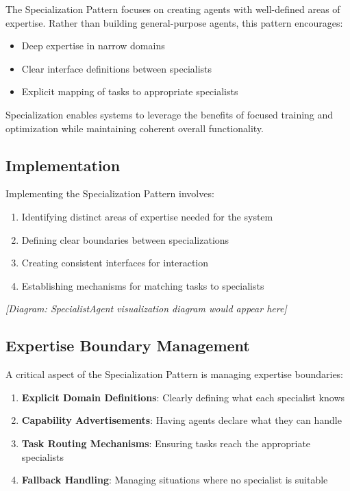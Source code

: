 \documentclass[11pt,oneside]{book}
\providecommand{\tightlist}{%
  \setlength{\itemsep}{0pt}\setlength{\parskip}{0pt}}
\begin{document}
The Specialization Pattern focuses on creating agents with well-defined
areas of expertise. Rather than building general-purpose agents, this
pattern encourages:

\begin{itemize}
\tightlist
\item
  Deep expertise in narrow domains
\item
  Clear interface definitions between specialists
\item
  Explicit mapping of tasks to appropriate specialists
\end{itemize}

Specialization enables systems to leverage the benefits of focused
training and optimization while maintaining coherent overall
functionality.

\subsection{Implementation}\label{implementation-3}

Implementing the Specialization Pattern involves:

\begin{enumerate}
\def\labelenumi{\arabic{enumi}.}
\tightlist
\item
  Identifying distinct areas of expertise needed for the system
\item
  Defining clear boundaries between specializations
\item
  Creating consistent interfaces for interaction
\item
  Establishing mechanisms for matching tasks to specialists
\end{enumerate}

\emph{{[}Diagram: SpecialistAgent visualization diagram would appear
here{]}}

\subsection{Expertise Boundary
Management}\label{expertise-boundary-management}

A critical aspect of the Specialization Pattern is managing expertise
boundaries:

\begin{enumerate}
\def\labelenumi{\arabic{enumi}.}
\tightlist
\item
  \textbf{Explicit Domain Definitions}: Clearly defining what each
  specialist knows
\item
  \textbf{Capability Advertisements}: Having agents declare what they
  can handle
\item
  \textbf{Task Routing Mechanisms}: Ensuring tasks reach the appropriate
  specialists
\item
  \textbf{Fallback Handling}: Managing situations where no specialist is
  suitable
\end{enumerate}
\end{document}
